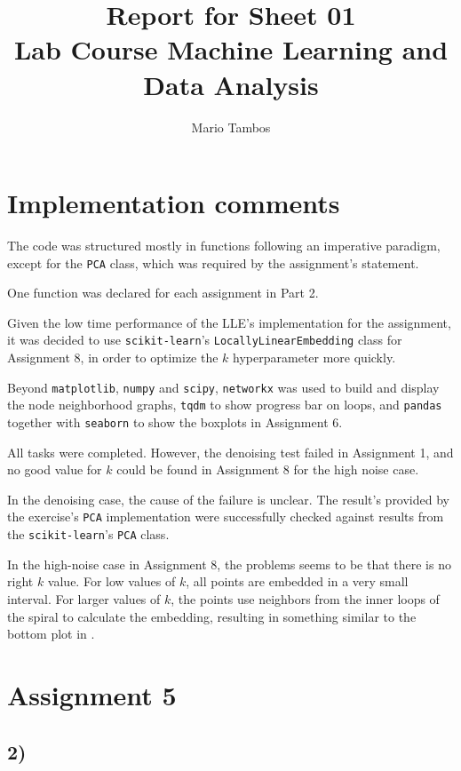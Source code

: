 \documentclass[a4paper,11pt]{article}
\begin{document}
\author{Mario Tambos}
\title{\vspace{-2cm}Report for Sheet 01\\
\small{Lab Course Machine Learning and Data Analysis}}
\maketitle

\section*{Implementation comments}
The code was structured mostly in functions following an imperative paradigm,
except for the \verb|PCA| class, which was required by the assignment's statement.

One function was declared for each assignment in Part 2.

Given the low time performance of the LLE's implementation for the assignment,
it was decided to use \verb|scikit-learn|'s \verb|LocallyLinearEmbedding|
class for Assignment 8, in order to optimize the $k$ hyperparameter
more quickly.

Beyond \verb|matplotlib|, \verb|numpy| and \verb|scipy|, \verb|networkx| was
used to build and display the node neighborhood graphs, \verb|tqdm| to show
progress bar on loops, and \verb|pandas| together with \verb|seaborn| to show
the boxplots in Assignment 6.

All tasks were completed. However, the denoising test failed in Assignment 1,
and no good value for $k$ could be found in Assignment 8 for the high noise case.

In the denoising case, the cause of the failure is unclear. The result's provided
by the exercise's \verb|PCA| implementation were successfully checked against
results from the \verb|scikit-learn|'s \verb|PCA| class.

In the high-noise case in Assignment 8, the problems seems to be that there is no
right $k$ value. For low values of $k$, all points are embedded in a very small
interval. For larger values of $k$, the points use neighbors from the inner loops
of the spiral to calculate the embedding, resulting in something similar to the
bottom plot in .
\section*{Assignment 5}
\subsection*{2)}
\end{document}
